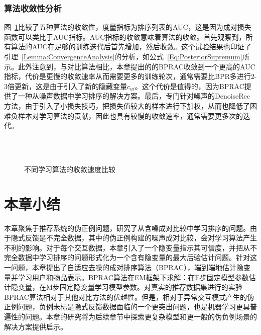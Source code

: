 \subsubsection{算法收敛性分析}
 图~\ref{Fig:Covergence}比较了五种算法的收敛性，度量指标为排序列表的AUC，这是因为成对损失函数可以类比于AUC指标\cite{Steffen:2009:UAI}。AUC指标的收敛意味着算法的收敛。首先观察到，所有算法的AUC在足够的训练迭代后首先增加，然后收敛。这个试验结果也印证了引理~\ref{Lemma:ConvergenceAnalysis}的分析，如公式~\eqref{Eq:PosteriorSupremum}所示。此外注意到，与对比算法相比，本章提出的的BPRAC收敛到一个更高的AUC指标，代价是更慢的收敛速率从而需要更多的训练轮次，通常需要比BPR多进行2-3倍更新，这是由于引入了新的隐藏变量$c_{ui}$。这个代价是值得的，因为BPRAC提供了一种从噪声数据中学习排序的解决方案。最后，专门针对噪声的DenoiseRec方法，由于引入了小损失技巧，把损失值较大的样本进行下加权，从而也降低了困难负样本对学习算法的贡献，因此也具有较慢的收敛速率，通常需要更多次的迭代。
\begin{figure}[!]
	\centering
	\\
	\\
	\caption{不同学习算法的收敛速度比较}
	\label{Fig:Covergence}
\end{figure}

\section{本章小结}
本章聚焦于推荐系统的伪正例问题，研究了从含噪成对比较中学习排序的问题。由于隐式反馈是不完全数据，其中的伪正例构建的噪声成对比较，会对学习算法产生不利的影响。对于每个交互数据，本章引入了一个隐变量指示其可信度，并把从不完全数据中学习排序的问题形式化为一个含有隐变量的最大后验估计问题。针对这一问题，本章提出了自适应去噪的成对排序算法（BPRAC），端到端地估计隐变量并学习用户和物品表示。BPRAC算法在EM框架下求解：在E步固定模型参数估计隐变量，在M步固定隐变量学习模型参数。对真实的推荐数据集进行的实验BPRAC算法相对于其他对比方法的优越性。但是，相对于异常交互模式产生的伪正例问题，负例未标是隐式反馈数据面临的一个更突出问题，也是机器学习更具普遍性的问题。本章的研究将为后续章节中探索更复杂模型和更一般的伪负例场景的解决方案提供启示。